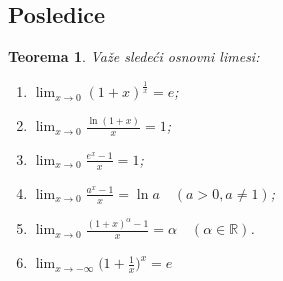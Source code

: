 \documentclass[a4paper,12pt]{article}
\theoremstyle{plain}
\newtheorem{theorem}{Teorema}[section]
\theoremstyle{definition}
\theoremstyle{remark}
\begin{document}
\subsection{Posledice}
\begin{theorem}
    Važe sledeći osnovni limesi:
    \begin{enumerate}[label=\alph*)]
        \item $\displaystyle \lim_{x \to 0} (1 + x)^{\frac{1}{x}} = e$;
        \item $\displaystyle \lim_{x \to 0} \frac{\ln(1+x)}{x} = 1$;
        \item $\displaystyle \lim_{x \to 0} \frac{e^x - 1}{x} = 1$;
        \item $\displaystyle \lim_{x \to 0} \frac{a^x - 1}{x} = \ln a \quad (a > 0, a \neq 1)$;
        \item $\displaystyle \lim_{x \to 0} \frac{(1+x)^\alpha - 1}{x} = \alpha \quad (\alpha \in \mathbb{R})$.
        \item $\displaystyle \lim_{x \to -\infty} \bigg(1 + \frac{1}{x}\bigg)^x = e$
    \end{enumerate}
\end{theorem}
\end{document}
